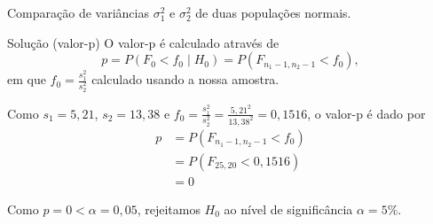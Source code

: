 \documentclass[9pt]{beamer}
\begin{document}
\begin{frame}{Comparação de variâncias $\sigma_1^2$ e $\sigma_2^2$ de duas populações normais.}

\begin{block}{Solução (valor-p)}
	O valor-p é calculado através de
	$$p=P\left( F_0 < f_0 \mid H_0 \right) = P\left( F_{n_1-1, n_2-1} < f_0 \right),$$
	em que $f_0 = \frac{s_1^2}{s_2^2}$ calculado usando a  nossa amostra.
	
	Como $s_1=5,21$, $s_2 = 13,38$ e $f_0 = \frac{s_1^2}{s_2^2} = \frac{5,21^2}{13,38^2} = 0,1516$, o valor-p é dado por
	\begin{align*}
		p &= P\left( F_{n_1-1, n_2-1} < f_0 \right)\\
		&= P\left(F_{25, 20} < 0,1516\right)\\
		&= 0
	\end{align*}
	
	Como $p=0<\alpha=0,05$, rejeitamos $H_0$ ao nível de significância $\alpha=5\%$.
\end{block}
\end{frame}
\end{document}
